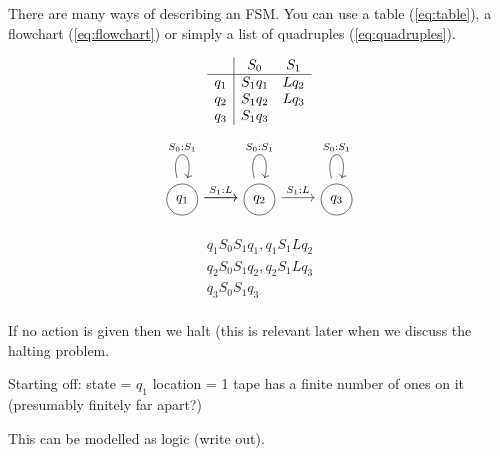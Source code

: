 \documentclass{article}
\begin{document}
There are many ways of describing an FSM. You can use a table
(\ref{eq:table}), a flowchart (\ref{eq:flowchart}) or simply
a list of quadruples (\ref{eq:quadruples}).

\begin{center}
\begin{minipage}{0.3\textwidth}
\begin{equation} \label{eq:table}
\begin{array}{c|c c}
	    & S_0     & S_1  \\
	\hline
	q_1 & S_1 q_1 & Lq_2 \\
	q_2 & S_1 q_2 & Lq_3 \\
	q_3 & S_1 q_3        \\
\end{array}
\end{equation}
\end{minipage}
\begin{minipage}{0.3\textwidth}
\begin{equation} \label{eq:flowchart}
	\begin{tikzcd}
		\tikz \path (0, 0) node(a) [circle, draw] {$q_1$};
		\arrow[loop above, "S_0:S_1"]
		\arrow[r, "S_1:L"]
		\arrow[r]
		&\tikz \path (0, 0) node(b) [circle, draw] {$q_2$};
		\arrow[loop above, "S_0:S_1"]
		\arrow[r, "S_1:L"]
		&\tikz \path (0, 0) node(b) [circle, draw] {$q_3$};
		\arrow[loop above, "S_0:S_1"]
	\end{tikzcd}
\end{equation}
\end{minipage}
\begin{minipage}{0.3\textwidth}
\begin{equation} \label{eq:quadruples}
	\begin{array}{c}
	q_1 S_0 S_1 q_1, q_1 S_1 Lq_2 \\
	q_2 S_0 S_1 q_2, q_2 S_1 Lq_3 \\
	q_3 S_0 S_1 q_3 \\
	\end{array}
\end{equation}
\end{minipage}
\end{center}

If no action is given then we halt (this is relevant later when we discuss the halting problem.

Starting off:
  state = $q_1$
  location = 1
  tape has a finite number of ones on it (presumably finitely far apart?)

This can be modelled as logic (write out).
\end{document}
